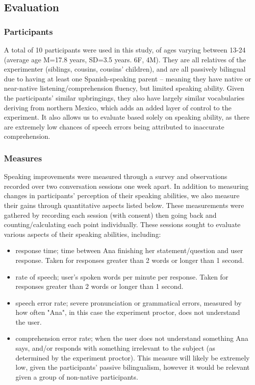 \documentclass{vgtc}                          %
\begin{document}
\subsection{Evaluation}

\subsubsection{Participants}
A total of 10 participants were used in this study, of ages varying between 13-24 (average age M=17.8 years, SD=3.5 years. 6F, 4M).
They are all relatives of the experimenter (siblings, cousins, cousins' children), and are all passively bilingual due to having at least one Spanish-speaking parent -- meaning they have native or near-native listening/comprehension fluency, but limited speaking ability.
Given the participants' similar upbringings, they also have largely similar vocabularies deriving from northern Mexico, which adds an added layer of control to the experiment.
It also allows us to evaluate based solely on speaking ability, as there are extremely low chances of speech errors being attributed to inaccurate comprehension.

\subsubsection{Measures}
Speaking improvements were measured through a survey and observations recorded over two conversation sessions one week apart.
In addition to measuring changes in participants' perception of their speaking abilities, we also measure their gains through quantitative aspects listed below.
These measurements were gathered by recording each session (with consent) then going back and counting/calculating each point individually.
These sessions sought to evaluate various aspects of their speaking abilities, including:

\begin{itemize}
    \item response time; time between Ana finishing her statement/question and user response. Taken for responses greater than 2 words or longer than 1 second.
    \item rate of speech; user’s spoken words per minute per response. Taken for responses greater than 2 words or longer than 1 second.
    \item speech error rate; severe pronunciation or grammatical errors, measured by how often "Ana", in this case the experiment proctor, does not understand the user.
    \item comprehension error rate; when the user does not understand something Ana says, and/or responds with something irrelevant to the subject (as determined by the experiment proctor).
    This measure will likely be extremely low, given the participants' passive bilingualism, however it would be relevant given a group of  non-native participants.
\end{itemize}
\end{document}
